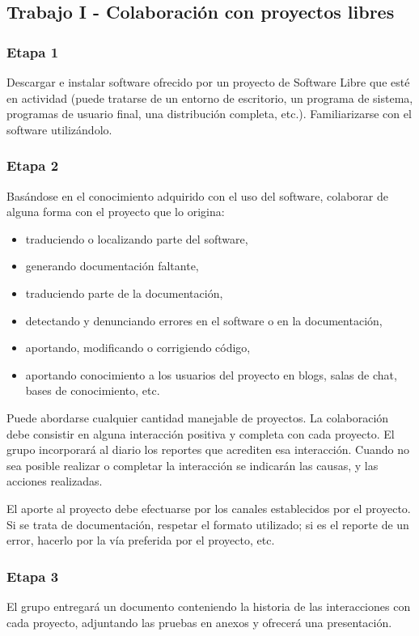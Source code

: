 \subsection {Trabajo I - Colaboración con proyectos libres}
\subsubsection{Etapa 1}  
Descargar e instalar software ofrecido por un proyecto de Software Libre que esté en actividad (puede tratarse de un entorno de escritorio, un programa de sistema, programas de usuario final, una distribución completa, etc.). Familiarizarse con el software utilizándolo. 
\subsubsection{Etapa 2} 
Basándose en el conocimiento adquirido con el uso del software, colaborar de alguna forma con el proyecto que lo origina: 
\begin{itemize}
	\item traduciendo o localizando parte del software,
	\item generando documentación faltante, 
	\item traduciendo parte de la documentación, 
	\item detectando y denunciando errores en el software o en la documentación,
	\item aportando, modificando o corrigiendo código,
	\item aportando conocimiento a los usuarios del proyecto en blogs, salas de chat, bases de conocimiento, etc.
\end{itemize}
Puede abordarse cualquier cantidad manejable de proyectos. La colaboración debe consistir en alguna interacción positiva y completa con cada proyecto. El grupo incorporará al diario los reportes que acrediten esa interacción. Cuando no sea posible realizar o completar la interacción se indicarán las causas, y las acciones realizadas.

El aporte al proyecto debe efectuarse por los canales establecidos por el proyecto. Si se trata de documentación, respetar el formato utilizado; si es el reporte de un error, hacerlo por la vía preferida por el proyecto, etc.

\subsubsection{Etapa 3} 
El grupo entregará un documento conteniendo la historia de las interacciones con cada proyecto, adjuntando las pruebas en anexos y ofrecerá una presentación.

